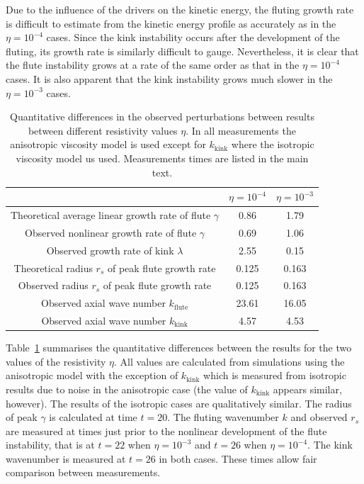 \documentclass[fleqn,usenatbib]{mnras}
\begin{document}
Due to the influence of the drivers on the kinetic energy, the fluting growth rate is difficult to estimate from the kinetic energy profile as accurately as in the $\eta=10^{-4}$ cases. Since the kink instability occurs after the development of the fluting, its growth rate is similarly difficult to gauge. Nevertheless, it is clear that the flute instability grows at a rate of the same order as that in the $\eta=10^{-4}$ cases. It is also apparent that the kink instability grows much slower in the $\eta=10^{-3}$ cases.

\begin{table}
\caption{Quantitative differences in the observed perturbations
  between results between different
    resistivity values $\eta$. In all measurements the
  anisotropic viscosity model is used except for $k_\text{kink}$ where the
  isotropic viscosity model us used. Measurements times are listed in
  the main text.}
\centering
\begin{tabular}{ccc}
&
$\eta=10^{-4}$ &
$\eta=10^{-3}$ \\
\midrule
Theoretical average linear growth rate of flute $\gamma$ & 0.86 & 1.79  \\
Observed nonlinear growth rate of flute $\gamma$ & 0.69 & 1.06  \\
Observed growth rate of kink $\lambda$ & 2.55 & 0.15\\
\midrule
Theoretical radius $r_s$ of peak flute growth rate & 0.125 & 0.163 \\
Observed radius $r_s$ of peak flute growth rate & 0.125 & 0.163 \\
\midrule
Observed axial wave number $k_{\text{flute}}$ & 23.61 & 16.05 \\
Observed axial wave number $k_{\text{kink}}$ & 4.57 & 4.53 \\
\end{tabular}
\label{tab:kink_fluting_params}
\end{table}

Table~\ref{tab:kink_fluting_params} summarises the quantitative
differences between the results for the two values of the
  resistivity $\eta$. All values are calculated from simulations using the anisotropic model with the exception of $k_{\text{kink}}$ which is measured from isotropic results due to noise in the anisotropic case (the value of $k_{\text{kink}}$ appears similar, however). The results of the isotropic cases are qualitatively similar. The radius of peak $\gamma$ is calculated at time $t=20$. The fluting wavenumber $k$ and observed $r_s$ are measured at times just prior to the nonlinear development of the flute instability, that is at $t=22$ when $\eta=10^{-3}$ and $t=26$ when $\eta = 10^{-4}$. The kink wavenumber is measured at $t=26$ in both cases. These times allow fair comparison between measurements.
\end{document}
